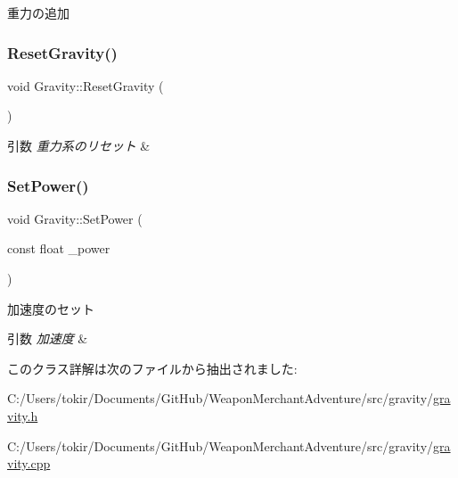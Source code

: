 重力の追加 

\mbox{\label{class_gravity_aa334a7ebbbd79ca28e7d29c3fc5c03ed}} 
\subsubsection{\texorpdfstring{Reset\+Gravity()}{ResetGravity()}}
{\footnotesize\ttfamily void Gravity\+::\+Reset\+Gravity (\begin{DoxyParamCaption}{ }\end{DoxyParamCaption})\hspace{0.3cm}{\ttfamily [inline]}}


\begin{DoxyParams}{引数}
{\em 重力系のリセット} & \\
\hline
\end{DoxyParams}
\mbox{\label{class_gravity_a5cc5e47fc7c323ea38a2a289bdefae51}} 
\subsubsection{\texorpdfstring{Set\+Power()}{SetPower()}}
{\footnotesize\ttfamily void Gravity\+::\+Set\+Power (\begin{DoxyParamCaption}\item[{const float}]{\+\_\+power }\end{DoxyParamCaption})\hspace{0.3cm}{\ttfamily [inline]}}



加速度のセット 


\begin{DoxyParams}{引数}
{\em 加速度} & \\
\hline
\end{DoxyParams}


このクラス詳解は次のファイルから抽出されました\+:\begin{DoxyCompactItemize}
\item 
C\+:/\+Users/tokir/\+Documents/\+Git\+Hub/\+Weapon\+Merchant\+Adventure/src/gravity/\mbox{\hyperlink{gravity_8h}{gravity.\+h}}\item 
C\+:/\+Users/tokir/\+Documents/\+Git\+Hub/\+Weapon\+Merchant\+Adventure/src/gravity/\mbox{\hyperlink{gravity_8cpp}{gravity.\+cpp}}\end{DoxyCompactItemize}
